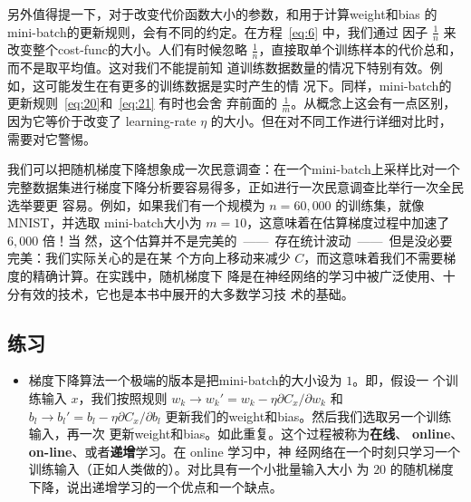 另外值得提一下，对于改变代价函数大小的参数，和用于计算\gls*{weight}和\gls*{bias}
的\gls*{mini-batch}的更新规则，会有不同的约定。在方程~\eqref{eq:6} 中，我们通过
因子 $\frac{1}{n}$ 来改变整个\gls*{cost-func}的大小。人们有时候忽略
$\frac{1}{n}$，直接取单个训练样本的代价总和，而不是取平均值。这对我们不能提前知
道训练数据数量的情况下特别有效。例如，这可能发生在有更多的训练数据是实时产生的情
况下。同样，\gls*{mini-batch}的更新规则~\eqref{eq:20}和~\eqref{eq:21} 有时也会舍
弃前面的 $\frac{1}{m}$。从概念上这会有一点区别，因为它等价于改变了%
\gls*{learning-rate} $\eta$ 的大小。但在对不同工作进行详细对比时，需要对它警惕。

我们可以把随机梯度下降想象成一次民意调查：在一个\gls*{mini-batch}上采样比对一个
完整数据集进行梯度下降分析要容易得多，正如进行一次民意调查比举行一次全民选举要更
容易。例如，如果我们有一个规模为 $n = 60,000$ 的训练集，就像 MNIST，并选取
\gls*{mini-batch}大小为 $m = 10$，这意味着在估算梯度过程中加速了 $6,000$ 倍！当
然，这个估算并不是完美的~——~存在统计波动~——~但是没必要完美：我们实际关心的是在某
个方向上移动来减少 $C$，而这意味着我们不需要梯度的精确计算。在实践中，随机梯度下
降是在神经网络的学习中被广泛使用、十分有效的技术，它也是本书中展开的大多数学习技
术的基础。

\subsection*{练习}

\begin{itemize}
\item 梯度下降算法一个极端的版本是把\gls*{mini-batch}的大小设为 $1$。即，假设一
  个训练输入 $x$，我们按照规则 $w_k \rightarrow w_k' = w_k - \eta \partial C_x /
  \partial w_k$ 和 $b_l \rightarrow b_l' = b_l - \eta \partial C_x / \partial
  b_l$ 更新我们的\gls*{weight}和\gls*{bias}。然后我们选取另一个训练输入，再一次
  更新\gls*{weight}和\gls*{bias}。如此重复。这个过程被称为\textbf{在线}、%
  \textbf{online}、\textbf{on-line}、或者\textbf{递增}学习。在 online 学习中，神
  经网络在一个时刻只学习一个训练输入（正如人类做的）。对比具有一个小批量输入大小
  为 $20$ 的随机梯度下降，说出递增学习的一个优点和一个缺点。
\end{itemize}


